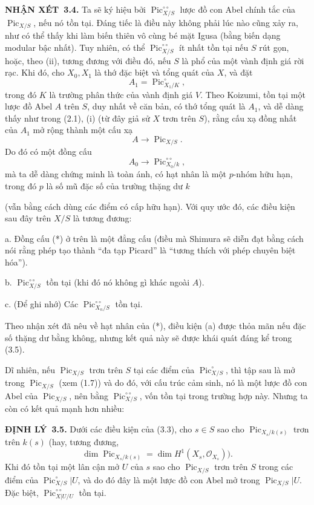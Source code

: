 \documentclass[11pt,twoside,openany]{book}
\numberwithin{equation}{section}
\newcommand{\src}[1]{%
  \phantomsection\hypertarget{src:\fgasourceid:#1}{}%
  \marginpar{\raggedleft\footnotesize\sffamily #1}%
}
\newcommand{\fgasourceid}{unset}
\newcommand{\result}[2]{\par\medskip\noindent\textbf{#1\if\relax\detokenize{#2}\relax\else\ #2\fi.}\quad}
\begin{document}
\result{NHẬN XÉT}{3.4} Ta sẽ ký hiệu bởi
$\operatorname{Pic}_{X/S}^{\circ\circ}$ lược đồ con Abel chính tắc của
$\operatorname{Pic}_{X/S}$, nếu nó tồn tại. Đáng tiếc là điều này không phải
lúc nào cũng xảy ra, như có thể thấy khi làm biến thiên vô cùng bé mặt Igusa
(bằng biến dạng modular bậc nhất). Tuy nhiên, có thể
$\operatorname{Pic}_{X/S}^{\circ\circ}$ ít nhất tồn tại nếu $S$ rút gọn,
hoặc, theo (ii), tương đương với điều đó, nếu $S$ là phổ của một vành định giá
rời rạc. Khi đó, cho $X_0,X_1$ là thớ đặc biệt và tổng quát của $X$, và đặt
\[
A_1=\operatorname{Pic}_{X_1/K}^\circ,
\]
trong đó $K$ là trường phân thức của vành định giá $V$. Theo Koizumi, tồn tại
một lược đồ Abel $A$ trên $S$, duy nhất về căn bản, có thớ tổng quát là $A_1$,
và dễ dàng thấy như trong (2.1), (i) (từ đây giả sử $X$ trơn trên $S$), rằng
cấu xạ đồng nhất của $A_1$ mở rộng thành một cấu xạ
\[
A\longrightarrow\operatorname{Pic}_{X/S}.
\]
Do đó có một đồng cấu
\[
\tag{*}A_0\longrightarrow\operatorname{Pic}_{X_0/k}^{\circ\circ},
\]
mà ta dễ dàng chứng minh là toàn ánh, có hạt nhân là một $p$-nhóm hữu hạn,
trong đó $p$ là số mũ đặc số của trường thặng dư $k$
\src{239}
(vẫn bằng cách dùng các điểm có cấp hữu hạn). Với quy ước đó, các điều kiện
sau đây trên $X/S$ là tương đương:

\medskip
\noindent a. Đồng cấu (*) ở trên là một đẳng cấu (điều mà Shimura sẽ diễn đạt
bằng cách nói rằng phép tạo thành ``đa tạp Picard'' là ``tương thích với phép
chuyên biệt hóa'').

\noindent b. $\operatorname{Pic}_{X/S}^{\circ\circ}$ tồn tại (khi đó nó
không gì khác ngoài $A$).

\noindent c. (Để ghi nhớ) Các
$\operatorname{Pic}_{X_n/S}^{\circ\circ}$ tồn tại.

Theo nhận xét đã nêu về hạt nhân của (*), điều kiện (a) được thỏa mãn nếu đặc
số thặng dư bằng không, nhưng kết quả này sẽ được khái quát đáng kể trong
(3.5).

Dĩ nhiên, nếu $\operatorname{Pic}_{X/S}$ trơn trên $S$ tại các điểm của
$\operatorname{Pic}_{X/S}^\circ$, thì tập sau là mở trong
$\operatorname{Pic}_{X/S}$ (xem (1.7)) và do đó, với cấu trúc cảm sinh, nó là
một lược đồ con Abel của $\operatorname{Pic}_{X/S}$, nên bằng
$\operatorname{Pic}_{X/S}^{\circ\circ}$, vốn tồn tại trong trường hợp này.
Nhưng ta còn có kết quả mạnh hơn nhiều:

\result{ĐỊNH LÝ}{3.5} Dưới các điều kiện của (3.3), cho $s\in S$ sao cho
$\operatorname{Pic}_{X_s/k(s)}$ trơn trên $k(s)$ (hay, tương đương,
\[
\dim\operatorname{Pic}_{X_s/k(s)}=\dim H^1(X_s,\mathcal O_{X_s})).
\]
Khi đó tồn tại một lân cận mở $U$ của $s$ sao cho
$\operatorname{Pic}_{X/S}$ trơn trên $S$ trong các điểm của $\operatorname{Pic}_{X/S}^\circ|U$, và do đó đây là một lược
đồ con Abel mở trong $\operatorname{Pic}_{X/S}|U$. Đặc biệt,
$\operatorname{Pic}_{X|U/U}^{\circ\circ}$ tồn tại.
\end{document}
